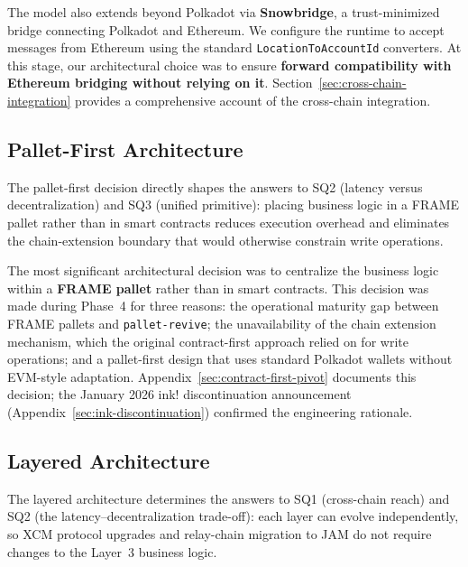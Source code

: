 The model also extends beyond Polkadot via \textbf{Snowbridge}, a trust-minimized bridge connecting Polkadot and Ethereum. We configure the runtime to accept messages from Ethereum using the standard \texttt{LocationToAccountId} converters. At this stage, our architectural choice was to ensure \textbf{forward compatibility with Ethereum bridging without relying on it}. Section~\ref{sec:cross-chain-integration} provides a comprehensive account of the cross-chain integration.

\subsection{Pallet-First Architecture}\label{subsec:pallet-first}

The pallet-first decision directly shapes the answers to SQ2 (latency versus decentralization) and SQ3 (unified primitive): placing business logic in a FRAME pallet rather than in smart contracts reduces execution overhead and eliminates the chain-extension boundary that would otherwise constrain write operations.

The most significant architectural decision was to centralize the business logic within a \textbf{FRAME pallet} rather than in smart contracts. This decision was made during Phase~4 for three reasons: the operational maturity gap between FRAME pallets and \texttt{pallet-revive}; the unavailability of the chain extension mechanism, which the original contract-first approach relied on for write operations; and a pallet-first design that uses standard Polkadot wallets without EVM-style adaptation. Appendix~\ref{sec:contract-first-pivot} documents this decision; the January 2026 ink! discontinuation announcement (Appendix~\ref{sec:ink-discontinuation}) confirmed the engineering rationale.

\subsection{Layered Architecture}\label{subsec:layered-architecture}

The layered architecture determines the answers to SQ1 (cross-chain reach) and SQ2 (the latency--decentralization trade-off): each layer can evolve independently, so XCM protocol upgrades and relay-chain migration to JAM do not require changes to the Layer~3 business logic.

